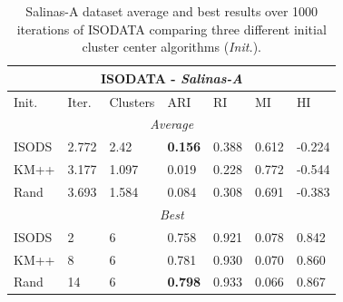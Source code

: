 \documentclass[a4paper, 10pt]{article}
\begin{document}
\begin{table}[ht]
      \caption{Salinas-A dataset average and best results over 1000 iterations
            of ISODATA comparing three different initial cluster center
            algorithms (\textit{Init.}).}
      \begin{tabular}{ |p{1.25cm}||p{1.25cm} p{1.25cm} p{1.25cm} p{1.25cm} p{1.25cm} p{1.25cm}|}
            \hline
            \multicolumn{7}{|c|}{\textbf{ISODATA} - \textit{Salinas-A}}        \\
            \hline
            Init. & Iter. & Clusters & ARI            & RI    & MI    & HI     \\
            \hline
            \multicolumn{7}{|c|}{\textit{Average}}                             \\
            \hline
            ISODS & 2.772 & 2.42     & \textbf{0.156} & 0.388 & 0.612 & -0.224 \\
            KM++  & 3.177 & 1.097    & 0.019          & 0.228 & 0.772 & -0.544 \\
            Rand  & 3.693 & 1.584    & 0.084          & 0.308 & 0.691 & -0.383 \\
            \hline
            \multicolumn{7}{|c|}{\textit{Best}}                                \\
            \hline
            ISODS & 2     & 6        & 0.758          & 0.921 & 0.078 & 0.842  \\
            KM++  & 8     & 6        & 0.781          & 0.930 & 0.070 & 0.860  \\
            Rand  & 14    & 6        & \textbf{0.798} & 0.933 & 0.066 & 0.867  \\
            \hline
      \end{tabular}
      \label{tab:salinastable}
\end{table}
\end{document}
